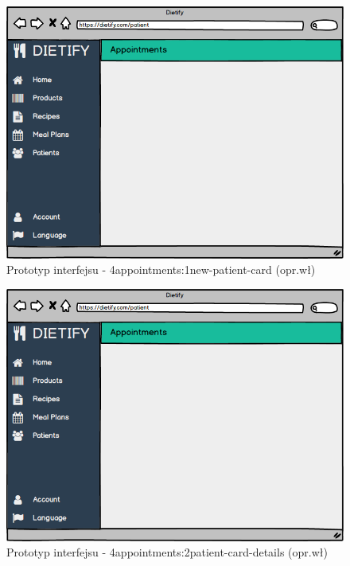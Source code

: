 \begin{minipage}{\textwidth}
    \begin{figure}[H]
        \centering\includegraphics[scale=0.55]{../mockup/4appointments_1new-patient-card.png}
        \caption{Prototyp interfejsu - 4appointments:1new-patient-card (opr.wł)}\label{rysunek:4appointments_1new-patient-card}
    \end{figure}
\end{minipage}
\begin{minipage}{\textwidth}
    \begin{figure}[H]
        \centering\includegraphics[scale=0.55]{../mockup/4appointments_2patient-card-details.png}
        \caption{Prototyp interfejsu - 4appointments:2patient-card-details (opr.wł)}\label{rysunek:4appointments_2patient-card-details}
    \end{figure}
\end{minipage}
